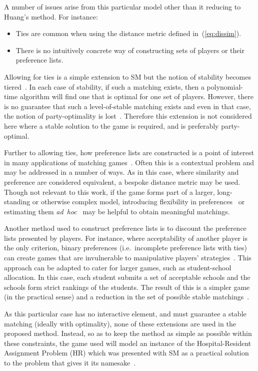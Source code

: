A number of issues arise from this particular model other than it reducing to
Huang's method. For instance:
\begin{itemize}
    \item Ties are common when using the distance metric defined
        in~(\ref{eq:dissim}).
    \item There is no intuitively concrete way of constructing sets of players
        or their preference lists.
\end{itemize}

Allowing for ties is a simple extension to SM but the notion of stability
becomes tiered~\cite{Iwama2016,Iwama1999}. In each case of stability, if such a
matching exists, then a polynomial-time algorithm will find one that is optimal
for one set of players. However, there is no guarantee that such a
level-of-stable matching exists and even in that case, the notion of
party-optimality is lost~\cite{Erdil2017}. Therefore this extension is not
considered here where a stable solution to the game is required, and is
preferably party-optimal.

Further to allowing ties, how preference lists are constructed is a point of
interest in many applications of matching games~\cite{Iwama2008,Manlove2002}.
Often this is a contextual problem and may be addressed in a number of ways. As
in this case, where similarity and preference are considered equivalent, a
bespoke distance metric may be used. Though not relevant to this work, if the
game forms part of a larger, long-standing or otherwise complex model,
introducing flexibility in preferences~\cite{Agarwal2017,Menzel2015} or
estimating them \emph{ad~hoc}~\cite{Rastegari2016} may be helpful to obtain
meaningful matchings.

Another method used to construct preference lists is to discount the preference
lists presented by players. For instance, where acceptability of another player
is the only criterion, binary preferences (i.e.\ incomplete preference lists
with ties) can create games that are invulnerable to manipulative players'
strategies~\cite{Bogomolnaia2004}. This approach can be adapted to cater for
larger games, such as student-school allocation. In this case, each student
submits a set of acceptable schools and the schools form strict rankings of the
students. The result of this is a simpler game (in the practical sense) and a
reduction in the set of possible stable
matchings~\cite{Haeringer2014,Haeringer2019}.

As this particular case has no interactive element, and must guarantee a stable
matching (ideally with optimality), none of these extensions are used in the
proposed method. Instead, so as to keep the method as simple as possible within
these constraints, the game used will model an instance of the Hospital-Resident
Assignment Problem (HR) which was presented with SM as a practical solution to
the problem that gives it its namesake~\cite{Gale1962}.


